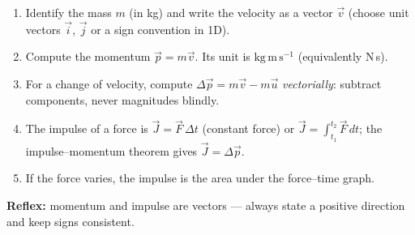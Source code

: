 \documentclass[11pt]{article}
\newcommand{\cle}[1]{{\popxbold\color{popdark}#1}}
\begin{document}
\begin{methode}
\begin{enumerate}
\item Identify the mass $m$ (in kg) and write the velocity as a \cle{vector} $\vec{v}$ (choose unit vectors $\vec{i}$, $\vec{j}$ or a sign convention in 1D).
\item Compute the momentum $\vec{p}=m\vec{v}$. Its unit is $\mathrm{kg\,m\,s^{-1}}$ (equivalently N\,s).
\item For a change of velocity, compute $\Delta\vec{p}=m\vec{v}-m\vec{u}$ \emph{vectorially}: subtract components, never magnitudes blindly.
\item The impulse of a force is $\vec{J}=\vec{F}\,\Delta t$ (constant force) or $\vec{J}=\displaystyle\int_{t_1}^{t_2}\vec{F}\,dt$; the impulse--momentum theorem gives $\vec{J}=\Delta\vec{p}$.
\item If the force varies, the impulse is the \cle{area under the force--time graph}.
\end{enumerate}
\textbf{Reflex:} momentum and impulse are vectors — always state a positive direction and keep signs consistent.
\end{methode}
\end{document}
